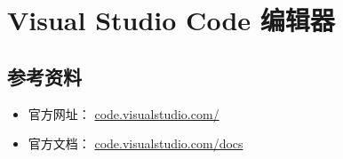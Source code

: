 \section{Visual Studio Code 编辑器}%
\label{sec:vsc}

\subsection{参考资料}%
\label{sub:vsc-refs}

\begin{itemize}
    \item 官方网址： \href{https://code.visualstudio.com/}
        {code.visualstudio.com/}
    \item 官方文档：
        \href{https://code.visualstudio.com/docs#vscode}
        {code.visualstudio.com/docs}
\end{itemize}

% 
% 
